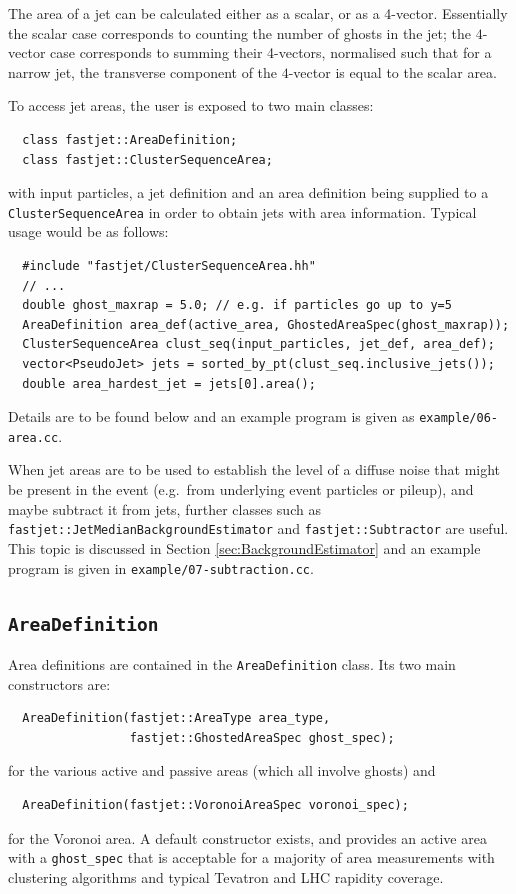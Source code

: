 \documentclass[12pt,a4]{article}
\newcommand{\ttt}[1]{{\small\texttt{#1}}}
\begin{document}
The area of a jet can be calculated either as a scalar, or as a 4-vector.
Essentially the scalar case corresponds to counting the number of
ghosts in the jet; the $4$-vector case corresponds to summing their
4-vectors, normalised such that for a narrow jet, the transverse
component of the $4$-vector is equal to the scalar area.

To access jet areas, the user is exposed to two main classes:
\begin{lstlisting}
  class fastjet::AreaDefinition;
  class fastjet::ClusterSequenceArea;
\end{lstlisting}
with input particles, a jet definition and an area definition being
supplied to a \ttt{ClusterSequenceArea} in order to obtain jets with
area information.
%
Typical usage would be as follows:
\begin{lstlisting}
  #include "fastjet/ClusterSequenceArea.hh"
  // ...
  double ghost_maxrap = 5.0; // e.g. if particles go up to y=5
  AreaDefinition area_def(active_area, GhostedAreaSpec(ghost_maxrap));
  ClusterSequenceArea clust_seq(input_particles, jet_def, area_def);
  vector<PseudoJet> jets = sorted_by_pt(clust_seq.inclusive_jets());
  double area_hardest_jet = jets[0].area();
\end{lstlisting}
Details are to be found below and an example program is given as
\ttt{example/06-area.cc}.


When jet areas are to be used to establish the level of a diffuse noise
that might be present in the event (e.g.\ from underlying event particles
or pileup), and maybe subtract it from jets, further classes such as
\ttt{fastjet::JetMedianBackgroundEstimator} and
\ttt{fastjet::Subtractor} are useful. This topic is discussed in
Section \ref{sec:BackgroundEstimator} and an example program is given
in \ttt{example/07-subtraction.cc}.



\subsection{\tt AreaDefinition}

Area definitions are contained in the \ttt{AreaDefinition}
class. Its two main constructors are:
\begin{lstlisting}
  AreaDefinition(fastjet::AreaType area_type, 
                 fastjet::GhostedAreaSpec ghost_spec);
\end{lstlisting}
for the various active and passive areas (which all involve ghosts)
and
\begin{lstlisting}
  AreaDefinition(fastjet::VoronoiAreaSpec voronoi_spec);
\end{lstlisting}
for the Voronoi area. A default constructor exists, and provides an
active area with a \ttt{ghost\_spec} that is acceptable for a majority
of area measurements with clustering algorithms and typical Tevatron
and LHC rapidity coverage.
\end{document}
